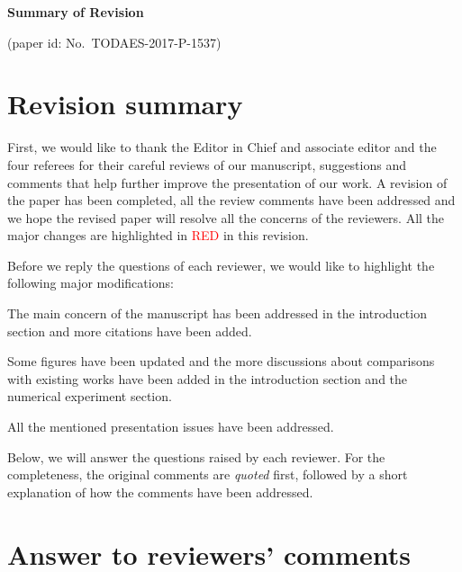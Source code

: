 \newpage
\onecolumn

\setcounter{page}{1} \vskip 2pc

\centerline{\LARGE \bf Summary of Revision}
\centerline{\Large (paper id: No.~TODAES-2017-P-1537)}

\section{Revision summary}

First, we would like to thank the Editor in Chief and associate editor
and the four referees for their careful reviews of our manuscript,
suggestions and comments that help further improve the presentation of
our work.  A revision of the paper has been completed, all the review
comments have been addressed and we hope the revised paper will
resolve all the concerns of the reviewers.  All the major changes are
highlighted in \textcolor{red}{RED} in this revision.

Before we reply the questions of each reviewer, we would like to
highlight the following major modifications:

\begin{itemlist}

\item The main concern of the manuscript has been addressed in the
introduction section and more citations have been added.

\item Some figures have been updated and the more
discussions about comparisons with existing works have been added in
the introduction section and the numerical experiment section.

\item All the mentioned presentation issues have been addressed.

\end{itemlist}

Below, we will answer the questions raised by each reviewer. For the
completeness, the original comments are {\it quoted} first, followed
by a short explanation of how the comments have been addressed.


\vspace{0.2in}


\section{Answer to reviewers' comments}

